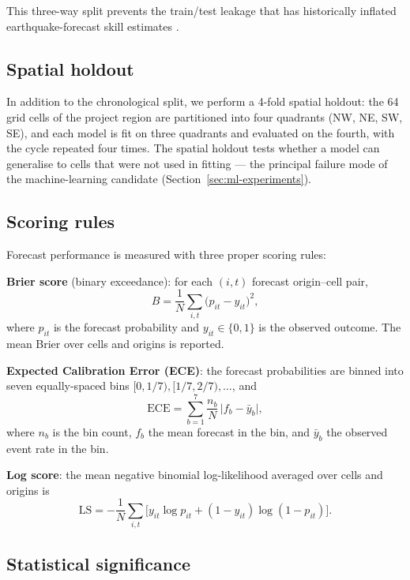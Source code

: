 \documentclass[10pt,a4paper,twocolumn]{article}
\begin{document}
This three-way split prevents the train/test leakage that has historically inflated earthquake-forecast skill estimates \cite{marzocchi2012}.

\subsection{Spatial holdout}

In addition to the chronological split, we perform a 4-fold spatial holdout: the 64 grid cells of the project region are partitioned into four quadrants (NW, NE, SW, SE), and each model is fit on three quadrants and evaluated on the fourth, with the cycle repeated four times. The spatial holdout tests whether a model can generalise to cells that were not used in fitting --- the principal failure mode of the machine-learning candidate (Section~\ref{sec:ml-experiments}).

\subsection{Scoring rules}

Forecast performance is measured with three proper scoring rules:

\textbf{Brier score} (binary exceedance): for each $(i,t)$ forecast origin--cell pair,
\begin{equation}\label{eq:brier}
B = \frac{1}{N}\sum_{i,t}\bigl(p_{it} - y_{it}\bigr)^{2},
\end{equation}
where $p_{it}$ is the forecast probability and $y_{it}\in\{0,1\}$ is the observed outcome. The mean Brier over cells and origins is reported.

\textbf{Expected Calibration Error (ECE)}: the forecast probabilities are binned into seven equally-spaced bins $[0,1/7),[1/7,2/7),\dots$, and
\begin{equation}\label{eq:ece}
\mathrm{ECE} = \sum_{b=1}^{7}\frac{n_{b}}{N}\,\bigl|f_{b} - \bar{y}_{b}\bigr|,
\end{equation}
where $n_b$ is the bin count, $f_b$ the mean forecast in the bin, and $\bar y_b$ the observed event rate in the bin.

\textbf{Log score}: the mean negative binomial log-likelihood averaged over cells and origins is
\begin{equation}\label{eq:logscore}
\mathrm{LS} = -\frac{1}{N}\sum_{i,t}\bigl[y_{it}\log p_{it} + (1-y_{it})\log(1-p_{it})\bigr].
\end{equation}

\subsection{Statistical significance}
\end{document}
